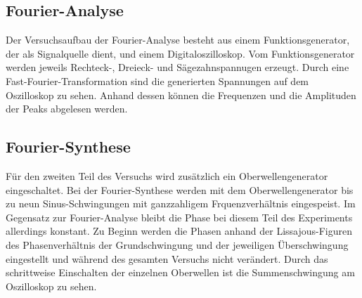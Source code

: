 \subsection{Fourier-Analyse}
Der Versuchsaufbau der Fourier-Analyse besteht aus einem Funktionsgenerator,
der als Signalquelle dient, und einem Digitaloszilloskop. Vom Funktionsgenerator
werden jeweils Rechteck-, Dreieck- und Sägezahnspannugen erzeugt. Durch eine
Fast-Fourier-Transformation sind die generierten Spannungen auf dem Oszilloskop
zu sehen. Anhand dessen können die Frequenzen und die Amplituden der Peaks
abgelesen werden.

\subsection{Fourier-Synthese}
Für den zweiten Teil des Versuchs wird zusätzlich ein Oberwellengenerator eingeschaltet.
Bei der Fourier-Synthese werden mit dem Oberwellengenerator bis zu neun Sinus-Schwingungen
mit ganzzahligem Frquenzverhältnis eingespeist.
Im Gegensatz zur Fourier-Analyse bleibt die Phase bei diesem Teil des Experiments
allerdings konstant. Zu Beginn werden die Phasen anhand der Lissajous-Figuren des
Phasenverhältnis der Grundschwingung und der jeweiligen Überschwingung eingestellt
und während des gesamten Versuchs nicht verändert. Durch das schrittweise Einschalten
der einzelnen Oberwellen ist die Summenschwingung am Oszilloskop zu sehen.
